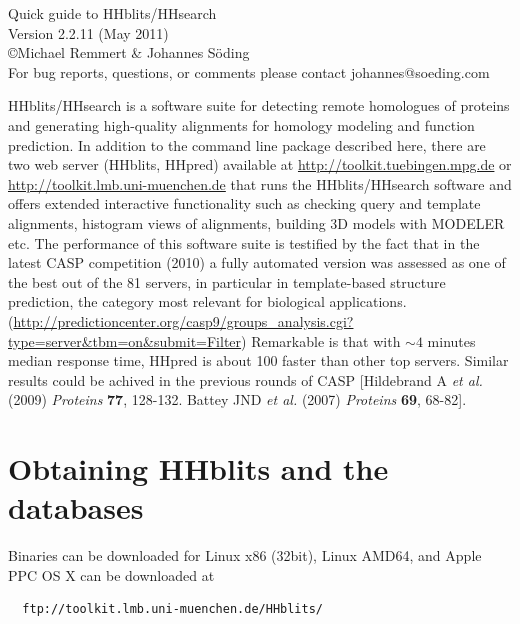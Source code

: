 \documentclass[11pt,a4paper]{article}
\begin{document}


\begin{center}

\vspace{30mm}
{\Huge Quick guide to HHblits/HHsearch}\\[2mm]
  Version 2.2.11 (May 2011)\\[2mm]
\copyright  Michael Remmert \& Johannes S\"oding\\[2mm]
For bug reports, questions, or comments please contact johannes@soeding.com
\end{center}

{\noindent HHblits/HHsearch is a software suite for detecting remote homologues of proteins and generating high-quality alignments for homology modeling and function prediction. In addition to the command line package described here, there are two web server (HHblits, HHpred) available at \url{http://toolkit.tuebingen.mpg.de} or \url{http://toolkit.lmb.uni-muenchen.de} that runs the HHblits/HHsearch software and offers extended interactive functionality such as checking query and template alignments, histogram views of alignments, building 3D models with MODELER etc. The performance of this software suite is testified by the fact that in the latest CASP competition (2010) a fully automated version was assessed as one of the best out of the 81 servers, in particular in template-based structure prediction, the category most relevant for biological applications. (\url{http://predictioncenter.org/casp9/groups_analysis.cgi?type=server&tbm=on&submit=Filter}) Remarkable is that with $\sim 4$ minutes median response time, HHpred is about 100 faster than other top servers. Similar results could be achived in the previous rounds of CASP [Hildebrand A \emph{et al.} (2009) \emph{Proteins} {\bf 77}, 128-132. Battey JND \emph{et al.} (2007) \emph{Proteins} {\bf 69}, 68-82].}

\newpage

\setlength{\parskip}{0mm}
\tableofcontents
\setlength{\parskip}{2mm}

\newpage

\section{Obtaining HHblits and the databases}

Binaries can be downloaded for Linux x86 (32bit), Linux AMD64, and Apple PPC OS X can be downloaded at
\begin{verbatim}
  ftp://toolkit.lmb.uni-muenchen.de/HHblits/
\end{verbatim}
\end{document}

